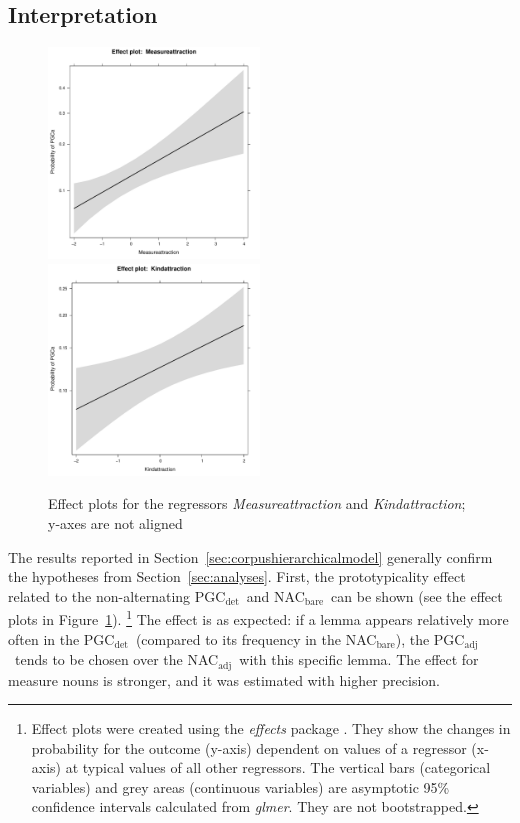 \documentclass[USenglish]{article}
\newcommand{\Sub}[1]{\ensuremath{\mathrm{_{#1}}}}
\newcommand{\NACb}{NAC\Sub{bare}}
\newcommand{\NACa}{NAC\Sub{adj}}
\newcommand{\PGCd}{PGC\Sub{det}}
\newcommand{\PGCa}{PGC\Sub{adj}}
\begin{document}


\subsection{Interpretation}
\label{sec:interpretation}


\begin{figure}[h!]
  \centering
  \includegraphics[width=0.5\textwidth]{../R/output/corpus_Measureattraction}~\includegraphics[width=0.5\textwidth]{../R/output/corpus_Kindattraction}
  \caption{Effect plots for the regressors \textit{Measureattraction} and \textit{Kindattraction}; y-axes are not aligned}
  \label{fig:eff:attraction}
\end{figure}

The results reported in Section~\ref{sec:corpushierarchicalmodel} generally confirm the hypotheses from Section~\ref{sec:analyses}.
First, the prototypicality effect related to the non-alternating \PGCd\ and \NACb\ can be shown (see the effect plots in Figure~\ref{fig:eff:attraction}).%
\footnote{Effect plots were created using the \textit{effects} package \citep{Fox2003}.
They show the changes in probability for the outcome (y-axis) dependent on values of a regressor (x-axis) at typical values of all other regressors.
The vertical bars (categorical variables) and grey areas (continuous variables) are asymptotic 95\% confidence intervals calculated from \textit{glmer}.
They are not bootstrapped.}
The effect is as expected:
if a lemma appears relatively more often in the \PGCd\ (compared to its frequency in the \NACb), the \PGCa\ tends to be chosen over the \NACa\ with this specific lemma.
The effect for measure nouns is stronger, and it was estimated with higher precision.
\end{document}
